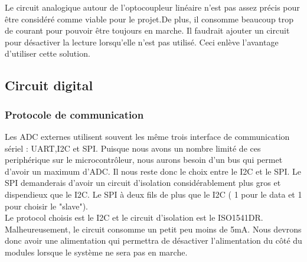 				Le circuit analogique autour de l'optocoupleur linéaire n'est pas assez précis pour être considéré comme viable pour le projet.De plus, il consomme beaucoup trop de courant pour pouvoir être toujours en marche. Il faudrait ajouter un circuit pour désactiver la lecture lorsqu'elle n'est pas utilisé. Ceci enlève l'avantage d'utiliser cette solution. 
				\newpage
				
			\subsection{Circuit digital}
				\subsubsection{Protocole de communication}
					Les ADC externes utilisent souvent les même trois interface de communication sériel : UART,I2C et SPI. Puisque nous avons un nombre limité de ces periphérique sur le microcontrôleur, nous aurons besoin d'un bus qui permet d'avoir un maximum d'ADC. Il nous reste donc le choix entre le I2C et le SPI. Le SPI demanderais d'avoir un circuit d'isolation considérablement plus gros et dispendieux que le I2C. Le SPI à deux fils de plus que le I2C ( 1 pour le data et 1 pour choisir le "slave"). \\
					Le protocol choisis est le I2C et le circuit d'isolation est le ISO1541DR. Malheureusement, le circuit consomme un petit peu moins de 5mA. Nous devrons donc avoir une alimentation qui permettra de désactiver l'alimentation du côté du modules lorsque le système ne sera pas en marche.
					
